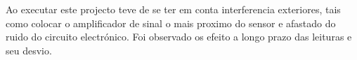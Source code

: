 \begin{columns}
{{\begin{minipage}[b!]{\linewidth}
\begin{minipage}[b!]{.2\linewidth}
			\end{minipage}
			\begin{minipage}[b!]{.6\linewidth}
				Ao executar este projecto teve de se ter em conta interferencia exteriores, tais como colocar o amplificador de sinal o mais proximo do sensor e afastado do ruido do circuito electrónico. Foi observado os efeito a longo prazo das leituras e seu desvio.
				\vspace{1cm}
			\end{minipage}
		\end{minipage}
	}
	\vspace{5cm}
}
\end{columns}
